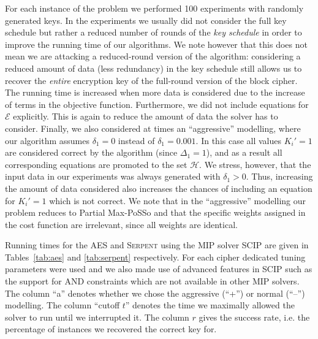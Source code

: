 \documentclass{llncs}
\newcommand{\Hs}{\ensuremath{\mathcal{H}}}
\newcommand{\Serpent}{\textsc{Serpent}\xspace}
\begin{document}
For each instance of the problem we performed 100 experiments with randomly generated keys. In the experiments we usually did not consider the full key schedule but rather a reduced number of rounds of the \emph{key schedule} in order to improve the running time of our algorithms. We note however that this does not mean we are attacking a reduced-round version of the algorithm: considering a reduced amount of data (less redundancy) in the key schedule still allows us to recover the \emph{entire} encryption key of the full-round version of the block cipher. The running time is increased when more data is considered due to the increase of terms in the objective function. Furthermore, we did not include equations for $\mathcal{E}$ explicitly. This is again to reduce the amount of data the solver has to consider. Finally, we also considered at times an ``aggressive'' modelling, where our algorithm assumes $\delta_1=0$ instead of $\delta_1 = 0.001$. In this case all values $K_i' = 1$ are considered correct by the algorithm (since $\Delta_1=1$), and as a result all corresponding equations are promoted to the set \Hs. We stress, however, that the input data in our experiments was always generated with $\delta_1 > 0$. Thus, increasing the amount of data considered also increases the chances of including an equation for $K_i' = 1$ which is not correct.
We note that in the ``aggressive'' modelling our problem reduces to Partial Max-PoSSo and that the specific weights assigned in the cost function are irrelevant, since all weights are identical.

Running times for the AES and \Serpent using the MIP solver SCIP \cite{scip} are given in Tables~\ref{tab:aes} and \ref{tab:serpent} respectively. For each cipher dedicated tuning parameters were used and we also made use of advanced features in SCIP such as the support for AND constraints which are not available in other MIP solvers. The column ``a'' denotes whether we chose the aggressive (``+'') or normal (``--'') modelling. The column ``cutoff $t$'' denotes the time we maximally allowed the solver to run until we interrupted it. The column $r$ gives the success rate, i.e. the percentage of instances we recovered the correct key for.
\end{document}

